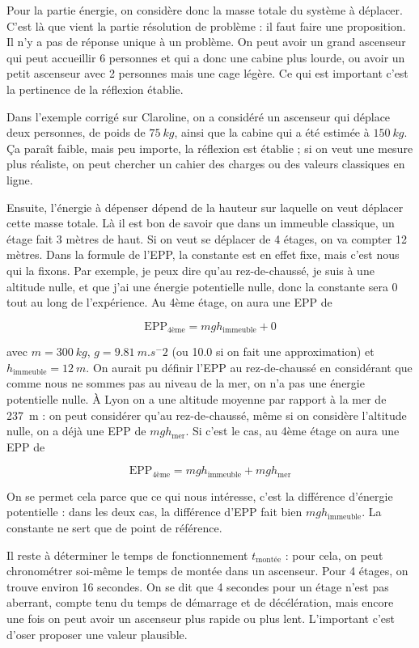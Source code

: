 \documentclass[../main/main.tex]{subfiles}
\begin{document}
Pour la partie énergie, on considère donc la masse totale du système à déplacer.
C'est là que vient la partie résolution de problème : il faut faire une
proposition. Il n'y a pas de réponse unique à un problème. On peut avoir un
grand ascenseur qui peut accueillir 6 personnes et qui a donc une cabine plus
lourde, ou avoir un petit ascenseur avec 2 personnes mais une cage légère. Ce
qui est important c'est la pertinence de la réflexion établie.

Dans l'exemple corrigé sur Claroline, on a considéré un ascenseur qui déplace
deux personnes, de poids de $\SI{75}{kg}$, ainsi que la cabine qui a été estimée
à $\SI{150}{kg}$. Ça paraît faible, mais peu importe, la réflexion est établie ;
si on veut une mesure plus réaliste, on peut chercher un cahier des charges ou
des valeurs classiques en ligne.

Ensuite, l'énergie à dépenser dépend de la hauteur sur laquelle on veut déplacer
cette masse totale. Là il est bon de savoir que dans un immeuble classique, un
étage fait 3 mètres de haut. Si on veut se déplacer de 4 étages, on va compter
12 mètres. Dans la formule de l'EPP, la constante est en effet fixe, mais c'est
nous qui la fixons. Par exemple, je peux dire qu'au rez-de-chaussé, je suis à
une altitude nulle, et que j'ai une énergie potentielle nulle, donc la constante
sera 0 tout au long de l'expérience. Au 4ème étage, on aura une EPP de

\[\mathrm{EPP}_\mathrm{4ème} = mgh_\mathrm{immeuble} + 0\]

avec $m= \SI{300}{kg}$, $g= \SI{9.81}{m.s^-2}$ (ou 10.0 si on fait une
approximation) et $h_\mathrm{immeuble}= \SI{12}{m}$. On aurait pu définir l'EPP
au rez-de-chaussé en considérant que comme nous ne sommes pas au niveau de la
mer, on n'a pas une énergie potentielle nulle. À Lyon on a une altitude moyenne
par rapport à la mer de \SI{237}{m} : on peut considérer qu'au rez-de-chaussé,
même si on considère l'altitude nulle, on a déjà une EPP de $mgh_\mathrm{mer}$.
Si c'est le cas, au 4ème étage on aura une EPP de

\[\mathrm{EPP}_\mathrm{4ème} = mgh_\mathrm{immeuble} + mgh_\mathrm{mer}\]

On se permet cela parce que ce qui nous intéresse, c'est la différence d'énergie
potentielle : dans les deux cas, la différence d'EPP fait bien
$mgh_\mathrm{immeuble}$. La constante ne sert que de point de référence.

Il reste à déterminer le temps de fonctionnement $t_\mathrm{montée}$ : pour
cela, on peut chronométrer soi-même le temps de montée dans un ascenseur. Pour 4
étages, on trouve environ 16 secondes. On se dit que 4 secondes pour un étage
n'est pas aberrant, compte tenu du temps de démarrage et de décélération, mais
encore une fois on peut avoir un ascenseur plus rapide ou plus lent. L'important
c'est d'oser proposer une valeur plausible.
\end{document}
